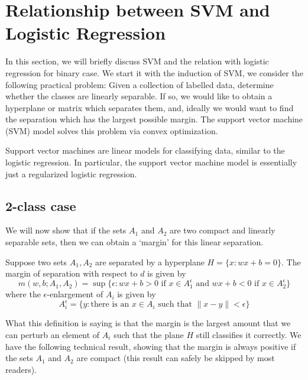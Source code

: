 \newpage
\section{Relationship between SVM and Logistic Regression}
In this section, we will briefly discuss SVM and the relation with logistic regression for binary case.
We start it with the induction of SVM, we consider the following practical problem: Given a collection of labelled data, determine whether the
classes are linearly separable. If so, we would like to obtain a hyperplane or matrix which separates them, and, ideally
we would want to find the separation which has the largest possible margin. The support vector machine (SVM) model solves this
problem via convex optimization.

Support vector machines are linear models for classifying data,
similar to the logistic regression. In particular, the support vector
machine model is essentially just a regularized logistic regression.

\subsection{2-class case}

We will now show that if the sets $A_1$ and $A_2$ are two compact and
linearly separable sets, then we can obtain a `margin' for this linear
separation.

\begin{definition}\label{margin_two_class}
	Suppose two sets $A_1, A_2$ are separated by a hyperplane
	$H=\{x:wx+b=0\}$. The margin of separation with respect to $d$ is
	given by
	\begin{equation}
	m(w,b; A_1, A_2) = \sup \{\epsilon:\text{$wx+b>0$ if $x\in A^{\epsilon}_1$ and $wx+b<0$ if $x\in A^\epsilon_2$}\}
	\end{equation}
	where the $\epsilon$-enlargement of $A_i$ is given by
	\begin{equation}
	A^\epsilon_i = \{y:\text{there is an $x\in A_i$ such that $\|x-y\| < \epsilon$}\}
	\end{equation}
\end{definition}

What this definition is saying is that the margin is the largest amount that we can perturb an element of $A_i$
such that the plane $H$ still classifies it correctly. 
We have the following technical result, showing that the margin is always positive if the sets $A_1$ and $A_2$ are
compact (this result can safely be skipped by most readers).

